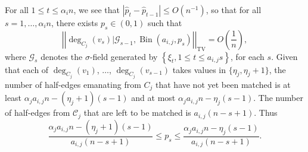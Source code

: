 \documentclass[11pt,reqno]{amsart}
\theoremstyle{definition}
\theoremstyle{remark}
\theoremstyle{conjecture}
\DeclareMathOperator{\tv}{TV}
\DeclareMathOperator{\bin}{Bin}
\begin{document}
For all $1 \leqslant t \leqslant \alpha_{i}n$, we see that $\left|\hat{p}_{t} - \hat{p}_{t-1}\right| \leqslant O(n^{-1})$, so that for all $s = 1, \ldots, \alpha_{i} n$, there exists $p_{s} \in (0,1)$ such that
\begin{equation}\label{bin_approx}
\left|\left|\deg_{C_{j}}(v_{s})\Big|\mathcal{G}_{s-1}, \bin\left(a_{i,j}, p_{s}\right)\right|\right|_{\tv} = O\left(\frac{1}{n}\right),
\end{equation}
where $\mathcal{G}_{s}$ denotes the $\sigma$-field generated by $\left\{\xi_{t}, 1 \leqslant t \leqslant a_{i,j}s\right\}$, for each $s$. Given that each of $\deg_{C_{j}}(v_{1})$, $\ldots$, $\deg_{C_{j}}(v_{s-1})$ takes values in $\{\eta_{j}, \eta_{j}+1\}$, the number of half-edges emanating from $C_{j}$ that have not yet been matched is at least $\alpha_{j} a_{i,j} n - (\eta_{j}+1)(s-1)$ and at most $\alpha_{j} a_{i,j} n - \eta_{j}(s-1)$. The number of half-edges from $\mathcal{C}_{j}$ that are left to be matched is $a_{i,j}(n - s + 1)$. Thus
\begin{equation}\label{range_p_s}
\frac{\alpha_{j} a_{i,j} n - (\eta_{j}+1)(s-1)}{a_{i,j}(n-s+1)} \leqslant p_{s} \leqslant \frac{\alpha_{j} a_{i,j} n - \eta_{j}(s-1)}{a_{i,j}(n-s+1)}.
\end{equation}
\end{document}
